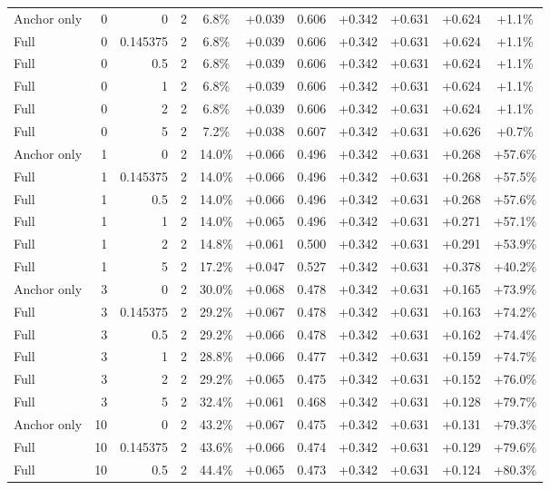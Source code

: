 \begin{table}[htbp]
\begin{tabular}{lrrrccccccc}
Anchor only & 0 & 0 & 2 & 6.8\% & +0.039 & 0.606 & +0.342 & +0.631 & +0.624 & +1.1\% \\
Full & 0 & 0.145375 & 2 & 6.8\% & +0.039 & 0.606 & +0.342 & +0.631 & +0.624 & +1.1\% \\
Full & 0 & 0.5 & 2 & 6.8\% & +0.039 & 0.606 & +0.342 & +0.631 & +0.624 & +1.1\% \\
Full & 0 & 1 & 2 & 6.8\% & +0.039 & 0.606 & +0.342 & +0.631 & +0.624 & +1.1\% \\
Full & 0 & 2 & 2 & 6.8\% & +0.039 & 0.606 & +0.342 & +0.631 & +0.624 & +1.1\% \\
Full & 0 & 5 & 2 & 7.2\% & +0.038 & 0.607 & +0.342 & +0.631 & +0.626 & +0.7\% \\
Anchor only & 1 & 0 & 2 & 14.0\% & +0.066 & 0.496 & +0.342 & +0.631 & +0.268 & +57.6\% \\
Full & 1 & 0.145375 & 2 & 14.0\% & +0.066 & 0.496 & +0.342 & +0.631 & +0.268 & +57.5\% \\
Full & 1 & 0.5 & 2 & 14.0\% & +0.066 & 0.496 & +0.342 & +0.631 & +0.268 & +57.6\% \\
Full & 1 & 1 & 2 & 14.0\% & +0.065 & 0.496 & +0.342 & +0.631 & +0.271 & +57.1\% \\
Full & 1 & 2 & 2 & 14.8\% & +0.061 & 0.500 & +0.342 & +0.631 & +0.291 & +53.9\% \\
Full & 1 & 5 & 2 & 17.2\% & +0.047 & 0.527 & +0.342 & +0.631 & +0.378 & +40.2\% \\
Anchor only & 3 & 0 & 2 & 30.0\% & +0.068 & 0.478 & +0.342 & +0.631 & +0.165 & +73.9\% \\
Full & 3 & 0.145375 & 2 & 29.2\% & +0.067 & 0.478 & +0.342 & +0.631 & +0.163 & +74.2\% \\
Full & 3 & 0.5 & 2 & 29.2\% & +0.066 & 0.478 & +0.342 & +0.631 & +0.162 & +74.4\% \\
Full & 3 & 1 & 2 & 28.8\% & +0.066 & 0.477 & +0.342 & +0.631 & +0.159 & +74.7\% \\
Full & 3 & 2 & 2 & 29.2\% & +0.065 & 0.475 & +0.342 & +0.631 & +0.152 & +76.0\% \\
Full & 3 & 5 & 2 & 32.4\% & +0.061 & 0.468 & +0.342 & +0.631 & +0.128 & +79.7\% \\
Anchor only & 10 & 0 & 2 & 43.2\% & +0.067 & 0.475 & +0.342 & +0.631 & +0.131 & +79.3\% \\
Full & 10 & 0.145375 & 2 & 43.6\% & +0.066 & 0.474 & +0.342 & +0.631 & +0.129 & +79.6\% \\
Full & 10 & 0.5 & 2 & 44.4\% & +0.065 & 0.473 & +0.342 & +0.631 & +0.124 & +80.3\% \\

\end{tabular}
\end{table}
